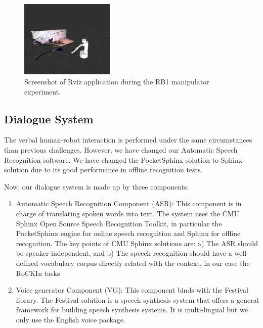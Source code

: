 \documentclass[conference]{IEEEtran}
\begin{document}

% 
% 
\begin{figure}[ht]
  \centering
  \includegraphics[width=0.4\textwidth]{199}
  \caption{Screenshot of Rviz application during the RB1 manipulator experiment.} 
  \label{fig:RB1arm}
\end{figure}



\subsection{Dialogue System}

The verbal human-robot interaction is performed under the same circumstances than previous challenges. 
However, we have changed our Automatic Speech Recognition software. 
We have changed the PocketSphinx solution to Sphinx solution due to its good performance in offline recognition tests.

Now, our dialogue system is made up by three components. 
\begin{enumerate}
 \item Automatic Speech Recognition Component (ASR): This component is in charge of translating spoken words into text. 
 The system uses the CMU Sphinx Open Source Speech Recognition Toolkit, in particular the PocketSphinx engine for online speech recognition and Sphinx for offline recognition. 
  The key points of  CMU Sphinx solutions are: a)  The ASR should be speaker-independent,  and b) The speech recognition should have a well-defined vocabulary corpus directly related with the context, in our case the RoCKIn tasks
  \item Voice generator Component (VG): This component binds with the Festival library. The Festival solution is a speech synthesis system that offers a general framework for building speech synthesis systems. It is multi-lingual but we only use the English voice
package. 
\end{enumerate}
\end{document}
